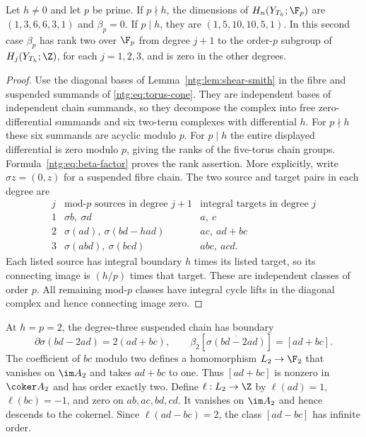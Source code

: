 \begin{proposition}\label{ntg:prop:shear-beta}
Let $h\ne0$ and let $p$ be prime. If $p\nmid h$, the dimensions
of $H_n(Y_{T_h};\F_p)$ are $(1,3,6,6,3,1)$ and $\beta_p=0$.
If $p\mid h$, they are $(1,5,10,10,5,1)$.
In this second case $\beta_p$ has rank two over $\F_p$ from
degree $j+1$ to the order-$p$ subgroup of $H_j(Y_{T_h};\Z)$,
for each $j=1,2,3$, and is zero in the other degrees.
\end{proposition}
\begin{proof}
Use the diagonal bases of Lemma~\ref{ntg:lem:shear-smith} in the fibre
and suspended summands of \eqref{ntg:eq:torus-cone}. They are independent
bases of independent chain summands, so they decompose the complex
into free zero-differential summands and six two-term complexes with
differential $h$. For $p\nmid h$ these six summands are acyclic
modulo $p$. For $p\mid h$ the entire displayed differential is zero
modulo $p$, giving the ranks of the five-torus chain groups.
Formula~\eqref{ntg:eq:beta-factor} proves the rank assertion. More
explicitly, write $\sigma z=(0,z)$ for a suspended fibre chain.
The two source and target pairs in each degree are
\begin{equation}\label{ntg:eq:explicit-beta}
\begin{array}{c|c|c}
 j&\text{mod-$p$ sources in degree }j+1&
       \text{integral targets in degree }j\\ \hline
 1&\sigma b,\ \sigma d&a,\ c\\
 2&\sigma(ad),\ \sigma(bd-had)&ac,\ ad+bc\\
 3&\sigma(abd),\ \sigma(bcd)&abc,\ acd.
\end{array}
\end{equation}
Each listed source has integral boundary $h$ times its listed
target, so its connecting image is $(h/p)$ times that target.
These are independent classes of order $p$. All remaining
mod-$p$ classes have integral cycle lifts in the diagonal complex
and hence connecting image zero.
\end{proof}

At $h=p=2$, the degree-three suspended chain has boundary
\[
 \partial\sigma(bd-2ad)=2(ad+bc),\qquad
 \beta_2[\overline{\sigma(bd-2ad)}]=[ad+bc].
\]
The coefficient of $bc$ modulo two defines a homomorphism
$L_2\to\F_2$ that vanishes on $\im A_2$ and takes $ad+bc$ to one.
Thus $[ad+bc]$ is nonzero in $\coker A_2$ and has order exactly two.
Define $\ell:L_2\to\Z$ by
$\ell(ad)=1$, $\ell(bc)=-1$, and zero on $ab,ac,bd,cd$.
It vanishes on $\im A_2$ and hence descends to the cokernel.
Since $\ell(ad-bc)=2$, the class $[ad-bc]$ has infinite order.


